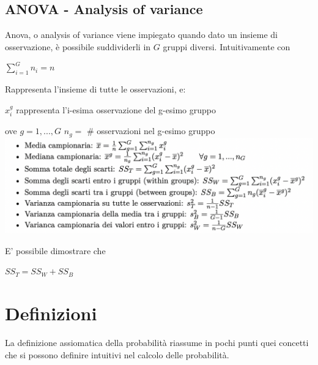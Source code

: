 \subsection{ANOVA - Analysis of variance}
Anova, o analysis of variance viene impiegato quando dato un insieme di osservazione, è possibile suddividerli in $G$ gruppi diversi. Intuitivamente con \begin{center}
$\sum_{i=1}^G n_i = n$
\end{center}
Rappresenta l'insieme di tutte le osservazioni, e:
\begin{center}
$x_i^g$ rappresenta l'i-esima osservazione del g-esimo gruppo
\end{center}
ove $g = 1, ..., G$ \hfill $n_g =$ \# osservazioni nel g-esimo gruppo
\includegraphics[scale=0.7]{anova}

E' possibile dimostrare che\begin{center}
$SS_T = SS_W + SS_B$
\end{center}





\section{Definizioni}
La definizione assiomatica della probabilità riassume in pochi punti quei concetti che si possono definire intuitivi nel calcolo delle probabilità.

